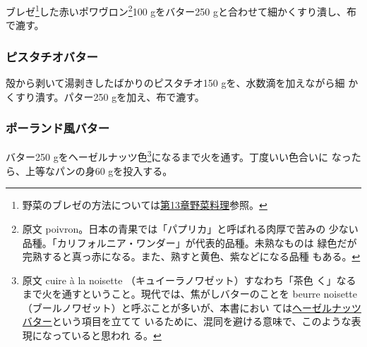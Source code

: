\begin{recette}
ブレゼ\footnote{野菜のブレゼの方法については\protect\hyperlink{}{第13章野菜料理}参照。}した赤いポワヴロン\footnote{原文
  poivron。日本の青果では「パプリカ」と呼ばれる肉厚で苦みの
  少ない品種。「カリフォルニア・ワンダー」が代表的品種。未熟なものは
  緑色だが完熟すると真っ赤になる。また、熟すと黄色、紫などになる品種
  もある。}100 gをバター250 gと合わせて細かくすり潰し、布で漉す。

\maeaki

\hypertarget{beurre-de-pistache}{%
\subsubsection{ピスタチオバター}\label{beurre-de-pistache}}



殻から剥いて湯剥きしたばかりのピスタチオ150 gを、水数滴を加えながら細
かくすり潰す。パター250 gを加え、布で漉す。

\maeaki

\hypertarget{beurre-a-la-polonaise}{%
\subsubsection{ポーランド風バター}\label{beurre-a-la-polonaise}}



バター250 gをヘーゼルナッツ色\footnote{原文 cuire à la noisette
  （キュイーラノワゼット）すなわち「茶色
  く」なるまで火を通すということ。現代では、焦がしバターのことを beurre
  noisette （ブールノワゼット）と呼ぶことが多いが、本書におい
  ては\protect\hyperlink{beurre-de-noisette}{ヘーゼルナッツバター}という項目を立てて
  いるために、混同を避ける意味で、このような表現になっていると思われ
  る。}になるまで火を通す。丁度いい色合いに なったら、上等なパンの身60
gを投入する。


\end{recette}
